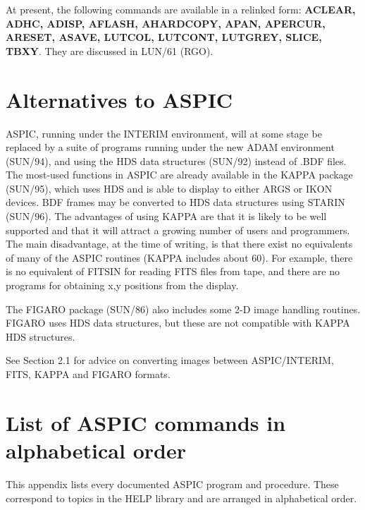 At present, the following commands are available in a relinked form:
{\bf ACLEAR, ADHC, ADISP, AFLASH, AHARDCOPY, APAN, APERCUR, ARESET, ASAVE,
LUTCOL, LUTCONT, LUTGREY, SLICE, TBXY}.
They are discussed in LUN/61 (RGO).

\newpage
\section{Alternatives to ASPIC}

ASPIC, running under the INTERIM environment, will at some stage be replaced by a
suite of programs running under the new ADAM environment (SUN/94), and using
the HDS data structures (SUN/92) instead of .BDF files.
The most-used functions in ASPIC are already available in the KAPPA package
(SUN/95), which uses HDS and is able to display to either ARGS or IKON devices.
BDF frames may be converted to HDS data structures using STARIN (SUN/96).
The advantages of using KAPPA are that  it is likely to be well supported and
that it will attract a growing number of users and programmers.
The main disadvantage, at the time of writing, is that there exist no
equivalents of many of the ASPIC routines (KAPPA includes about 60).
For example, there is no
equivalent of FITSIN for reading FITS files from tape, and there are
no programs for obtaining x,y positions from the display.

The FIGARO package (SUN/86) also includes some 2-D image handling routines.
FIGARO uses HDS data structures, but these are not compatible with KAPPA HDS
structures.

See Section 2.1 for advice on converting images between
ASPIC/INTERIM, FITS, KAPPA and FIGARO formats.

\appendix

\section{List of ASPIC commands in alphabetical order}

This appendix lists every documented ASPIC program and procedure.
These correspond to topics in the HELP library and are arranged in alphabetical
order.

